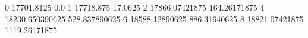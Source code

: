 0 17701.8125 0.0
1 17718.875 17.0625
2 17866.07421875 164.26171875
4 18230.650390625 528.837890625
6 18588.12890625 886.31640625
8 18821.07421875 1119.26171875
